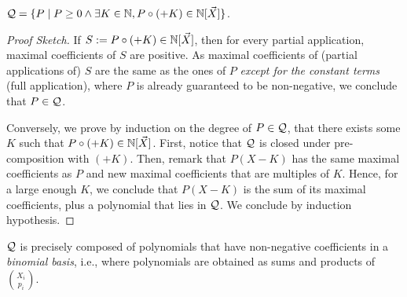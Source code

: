 \documentclass[a4paper,11pt]{article}
\begin{document}
\begin{conjecture}
    $\mathcal{Q} = \mathopen{\{} P \mid  P \geq 0 \wedge \exists K \in \mathbb{N}, P \circ (+K) \in \mathbb{N}[\vec{X}] \mathclose{\}}$.
\end{conjecture}
\begin{proof}[Proof Sketch]
    If $S \mathrel{:=} P \circ (+K) \in \mathbb{N}[\vec{X}]$, then for every partial application,
    maximal coefficients of $S$ are positive. As maximal coefficients of 
    (partial applications of) $S$ are the same as the ones of $P$
    \emph{except for the constant terms} (full application),
    where $P$ is already guaranteed to be non-negative, we conclude
    that $P \in \mathcal{Q}$.

    Conversely, we prove by induction on the degree of $P \in \mathcal{Q}$,
    that there exists some $K$ such that $P \circ (+K) \in \mathbb{N}[\vec{X}]$.
    First, notice that $\mathcal{Q}$ is closed under pre-composition with
    $(+K)$. Then, remark that $P(X - K)$ has the same maximal coefficients as
    $P$ and new maximal coefficients that are multiples of $K$. Hence, for a
    large enough $K$, we conclude that $P(X - K)$ is the sum of its maximal
    coefficients, plus a polynomial that lies in $\mathcal{Q}$. We conclude by
    induction hypothesis. 
\end{proof}

\begin{conjecture}
    $\mathcal{Q}$ is precisely composed of polynomials that
    have non-negative coefficients in a \emph{binomial basis},
    i.e., where polynomials are obtained
    as sums and products of $\binom{X_i}{p_i}$.
\end{conjecture}

\printbibliography

\appendix
\end{document}
